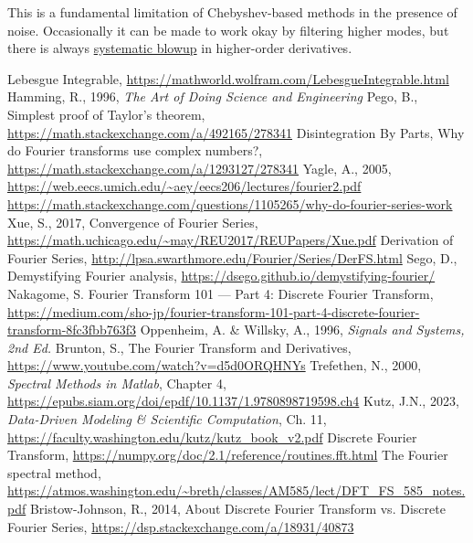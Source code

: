 \documentclass[10pt]{article}
\begin{document}
This is a fundamental limitation of Chebyshev-based methods in the presence of noise. Occasionally it can be made to work okay by filtering higher modes, but there is always \href{https://github.com/pavelkomarov/spectral-derivatives/blob/main/notebooks/filtering_noise.ipynb}{systematic blowup} in higher-order derivatives.

\printendnotes

\begin{thebibliography}{99} %
\raggedright
{}
	Lebesgue Integrable, \url{https://mathworld.wolfram.com/LebesgueIntegrable.html}
	Hamming, R., 1996, \textit{The Art of Doing Science and Engineering}
	Pego, B., Simplest proof of Taylor's theorem, \url{https://math.stackexchange.com/a/492165/278341}
	Disintegration By Parts, Why do Fourier transforms use complex numbers?, \url{https://math.stackexchange.com/a/1293127/278341}
	Yagle, A., 2005, \url{https://web.eecs.umich.edu/~aey/eecs206/lectures/fourier2.pdf}
	\url{https://math.stackexchange.com/questions/1105265/why-do-fourier-series-work}
	Xue, S., 2017, Convergence of Fourier Series, \url{https://math.uchicago.edu/~may/REU2017/REUPapers/Xue.pdf}
	Derivation of Fourier Series, \url{http://lpsa.swarthmore.edu/Fourier/Series/DerFS.html}
	Sego, D., Demystifying Fourier analysis, \url{https://dsego.github.io/demystifying-fourier/}
	Nakagome, S. Fourier Transform 101 — Part 4: Discrete Fourier Transform, \url{https://medium.com/sho-jp/fourier-transform-101-part-4-discrete-fourier-transform-8fc3fbb763f3}
	Oppenheim, A. \& Willsky, A., 1996, \textit{Signals and Systems, 2nd Ed.}
	Brunton, S., The Fourier Transform and Derivatives, \url{https://www.youtube.com/watch?v=d5d0ORQHNYs}
	Trefethen, N., 2000, \textit{Spectral Methods in Matlab}, Chapter 4, \url{https://epubs.siam.org/doi/epdf/10.1137/1.9780898719598.ch4}
	Kutz, J.N., 2023, \textit{Data-Driven Modeling \& Scientific Computation}, Ch. 11, \url{https://faculty.washington.edu/kutz/kutz_book_v2.pdf}
	Discrete Fourier Transform, \url{https://numpy.org/doc/2.1/reference/routines.fft.html}
	The Fourier spectral method, \url{https://atmos.washington.edu/~breth/classes/AM585/lect/DFT_FS_585_notes.pdf}
	Bristow-Johnson, R., 2014, About Discrete Fourier Transform vs. Discrete Fourier Series, \url{https://dsp.stackexchange.com/a/18931/40873}

\end{thebibliography}
\end{document}

